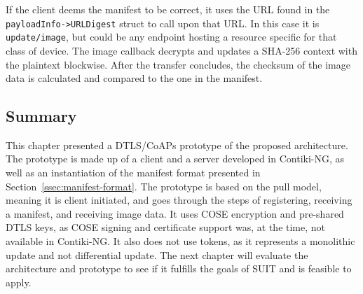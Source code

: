 \documentclass[0-thesis.tex]{subfiles}
\begin{document}
If the client deems the manifest to be correct, it uses the URL found in the
\texttt{payloadInfo->URLDigest} struct to call upon that URL. In this case it is
\texttt{update/image}, but could be any endpoint hosting a resource specific for that
class of device. The image callback decrypts and updates a SHA-256 context with the
plaintext blockwise. After the transfer concludes, the checksum of the image data is
calculated and compared to the one in the manifest.


\subsection{Summary}
\label{ssec:implementation-summary}
This chapter presented a DTLS/CoAPs prototype of the proposed architecture. The prototype
is made up of a client and a server developed in Contiki-NG, as well as an instantiation
of the manifest format presented in Section~\ref{ssec:manifest-format}. The prototype is
based on the pull model, meaning it is client initiated, and goes through the steps of
registering, receiving a manifest, and receiving image data. It uses COSE encryption and
pre-shared DTLS keys, as COSE signing and certificate support was, at the time, not
available in Contiki-NG. It also does not use tokens, as it represents a monolithic update
and not differential update. The next chapter will evaluate the architecture and prototype
to see if it fulfills the goals of SUIT and is feasible to apply.
\end{document}
